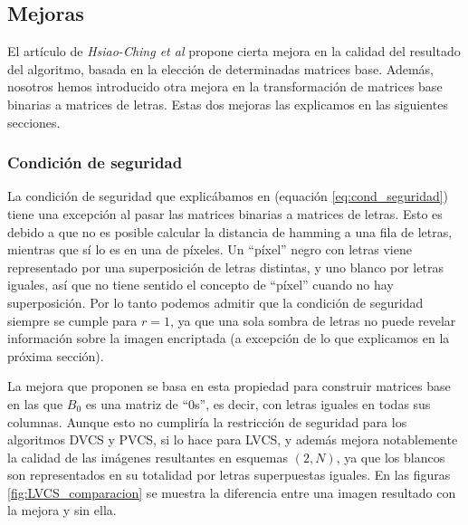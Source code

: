 \subsection{Mejoras}
El artículo de \textsl{Hsiao-Ching et al}\cite{articulo_base} propone cierta
mejora en la calidad del resultado del algoritmo, basada en la elección de
determinadas matrices base. Además, nosotros hemos introducido otra mejora en la
transformación de matrices base binarias a matrices de letras. Estas dos mejoras
las explicamos en las siguientes secciones.

\subsubsection{Condición de seguridad}
La condición de seguridad que explicábamos en 
(equación \ref{eq:cond_seguridad}) tiene una excepción al pasar las matrices
binarias a matrices de letras. Esto es debido a que no es posible calcular la
distancia de hamming a una fila de letras, mientras que sí lo es en una de
píxeles. Un ``píxel'' negro con letras viene representado por una superposición
de letras distintas, y uno blanco por letras iguales, así que no tiene sentido
el concepto de ``píxel'' cuando no hay superposición. Por lo tanto podemos
admitir que la condición de seguridad siempre se cumple para $r=1$, ya que una
sola sombra de letras no puede revelar información sobre la imagen encriptada (a
excepción de lo que explicamos en la próxima sección).

La mejora que proponen se basa en esta propiedad para construir matrices base en
las que $B_0$ es una matriz de ``0s'', es decir, con letras iguales en todas sus
columnas. Aunque esto no cumpliría la restricción de seguridad para los
algoritmos DVCS y PVCS, si lo hace para LVCS, y además mejora notablemente la
calidad de las imágenes resultantes en esquemas $(2,N)$, ya que los blancos son
representados en su totalidad por letras superpuestas iguales. En las figuras
\ref{fig:LVCS_comparacion} se muestra la diferencia entre una imagen resultado
con la mejora y sin ella.

